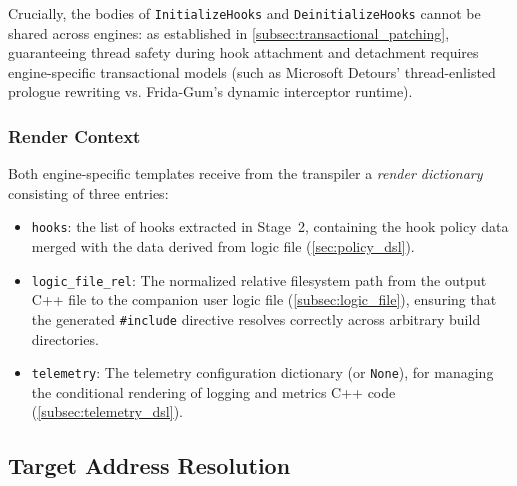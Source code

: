 Crucially, the bodies of \texttt{InitializeHooks} and \texttt{DeinitializeHooks} cannot be shared across engines: as established in \cref{subsec:transactional_patching}, guaranteeing thread safety during hook attachment and detachment requires engine-specific transactional models (such as Microsoft Detours' thread-enlisted prologue rewriting vs. Frida-Gum's dynamic interceptor runtime).

\subsubsection{Render Context}

Both engine-specific templates receive from the transpiler a \emph{render dictionary} consisting of three entries:
\begin{itemize}
	\item \texttt{hooks}: the list of hooks extracted in Stage~2, containing the hook policy data merged with the data derived from logic file (\cref{sec:policy_dsl}).
	\item \texttt{logic\_file\_rel}: The normalized relative filesystem path from the output C++ file to the companion user logic file (\cref{subsec:logic_file}), ensuring that the generated \texttt{\#include} directive resolves correctly across arbitrary build directories.
	\item \texttt{telemetry}: The telemetry configuration dictionary (or \texttt{None}), for managing the conditional rendering of logging and metrics C++ code (\cref{subsec:telemetry_dsl}).
\end{itemize}

\subsection{Target Address Resolution}
\label{subsec:address_resolution}

